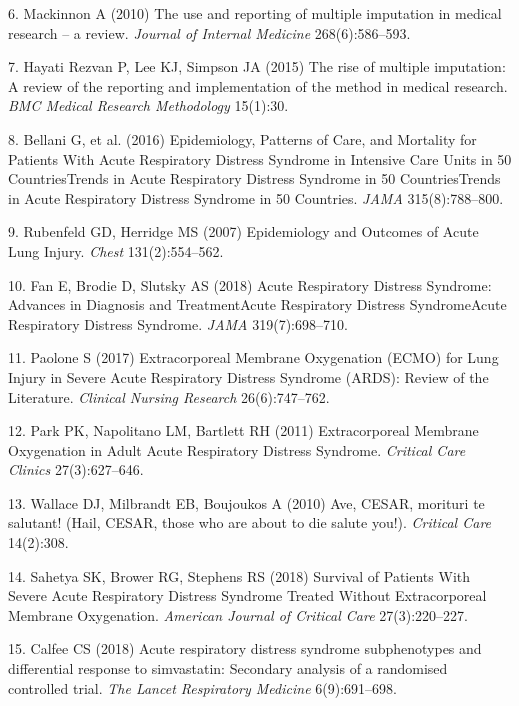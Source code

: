 \documentclass[12pt,]{article}
\begin{document}
\hypertarget{ref-mackinnon_use_2010}{}
6. Mackinnon A (2010) The use and reporting of multiple imputation in
medical research -- a review. \emph{Journal of Internal Medicine}
268(6):586--593.

\hypertarget{ref-hayati_rezvan_rise_2015}{}
7. Hayati Rezvan P, Lee KJ, Simpson JA (2015) The rise of multiple
imputation: A review of the reporting and implementation of the method
in medical research. \emph{BMC Medical Research Methodology} 15(1):30.

\hypertarget{ref-bellani_epidemiology_2016}{}
8. Bellani G, et al. (2016) Epidemiology, Patterns of Care, and
Mortality for Patients With Acute Respiratory Distress Syndrome in
Intensive Care Units in 50 CountriesTrends in Acute Respiratory Distress
Syndrome in 50 CountriesTrends in Acute Respiratory Distress Syndrome in
50 Countries. \emph{JAMA} 315(8):788--800.

\hypertarget{ref-rubenfeld_epidemiology_2007}{}
9. Rubenfeld GD, Herridge MS (2007) Epidemiology and Outcomes of Acute
Lung Injury. \emph{Chest} 131(2):554--562.

\hypertarget{ref-fan_acute_2018}{}
10. Fan E, Brodie D, Slutsky AS (2018) Acute Respiratory Distress
Syndrome: Advances in Diagnosis and TreatmentAcute Respiratory Distress
SyndromeAcute Respiratory Distress Syndrome. \emph{JAMA}
319(7):698--710.

\hypertarget{ref-paolone_extracorporeal_2017}{}
11. Paolone S (2017) Extracorporeal Membrane Oxygenation (ECMO) for Lung
Injury in Severe Acute Respiratory Distress Syndrome (ARDS): Review of
the Literature. \emph{Clinical Nursing Research} 26(6):747--762.

\hypertarget{ref-park_extracorporeal_2011}{}
12. Park PK, Napolitano LM, Bartlett RH (2011) Extracorporeal Membrane
Oxygenation in Adult Acute Respiratory Distress Syndrome. \emph{Critical
Care Clinics} 27(3):627--646.

\hypertarget{ref-wallace_ave_2010}{}
13. Wallace DJ, Milbrandt EB, Boujoukos A (2010) Ave, CESAR, morituri te
salutant! (Hail, CESAR, those who are about to die salute you!).
\emph{Critical Care} 14(2):308.

\hypertarget{ref-sahetya_survival_2018}{}
14. Sahetya SK, Brower RG, Stephens RS (2018) Survival of Patients With
Severe Acute Respiratory Distress Syndrome Treated Without
Extracorporeal Membrane Oxygenation. \emph{American Journal of Critical
Care} 27(3):220--227.

\hypertarget{ref-calfee_acute_2018}{}
15. Calfee CS (2018) Acute respiratory distress syndrome subphenotypes
and differential response to simvastatin: Secondary analysis of a
randomised controlled trial. \emph{The Lancet Respiratory Medicine}
6(9):691--698.
\end{document}
